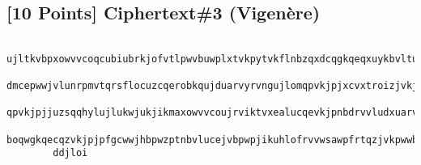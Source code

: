 \documentclass{article}
\begin{document}
    \subsection*{[10 Points] Ciphertext\#3 (Vigen\`{e}re)}
    \begin{verbatim}
        ujltkvbpxowvvcoqcubiubrkjofvtlpwvbuwplxtvkpytvkflnbzqxdcqgkqeqxuykbvlturvpxtw
        dmcepwwjvlunrpmvtqrsflocuzcqerobkqujduarvyrvngujlomqpvkjpjxcvxtroizjvkjvlohddv
        qpvkjpjjuzsqqhylujlukwjukjikmaxowvvcoujrviktvxealucqevkjpnbdrvvludxuarvuwjnonc
        boqwgkqecqzvkjpjpfgcwwjhbpwzptnbvlucejvbpwpjikuhlofrvvwsawpfrtqzjvkpwwbpbdq
        ddjloi
    \end{verbatim}

\newpage
\end{document}
